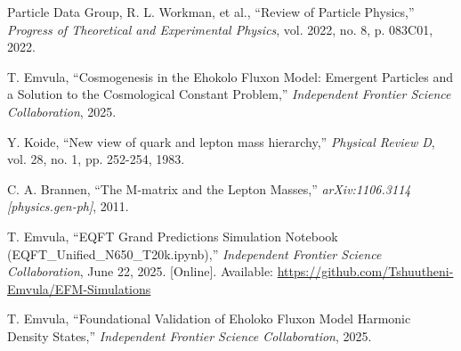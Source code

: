 \documentclass[11pt, twoside]{article}
\begin{document}

\begin{thebibliography}{9}
\raggedright

Particle Data Group, R. L. Workman, et al., ``Review of Particle Physics,'' \textit{Progress of Theoretical and Experimental Physics}, vol. 2022, no. 8, p. 083C01, 2022.

T. Emvula, ``Cosmogenesis in the Ehokolo Fluxon Model: Emergent Particles and a Solution to the Cosmological Constant Problem,'' \textit{Independent Frontier Science Collaboration}, 2025.

Y. Koide, ``New view of quark and lepton mass hierarchy,'' \textit{Physical Review D}, vol. 28, no. 1, pp. 252-254, 1983.

C. A. Brannen, ``The M-matrix and the Lepton Masses,'' \textit{arXiv:1106.3114 [physics.gen-ph]}, 2011.

T. Emvula, ``EQFT Grand Predictions Simulation Notebook (EQFT\_Unified\_N650\_T20k.ipynb),'' \textit{Independent Frontier Science Collaboration}, June 22, 2025. [Online]. Available: \url{https://github.com/Tshuutheni-Emvula/EFM-Simulations}

T. Emvula, ``Foundational Validation of Eholoko Fluxon Model Harmonic Density States,'' \textit{Independent Frontier Science Collaboration}, 2025.

\end{thebibliography}
\end{document}
